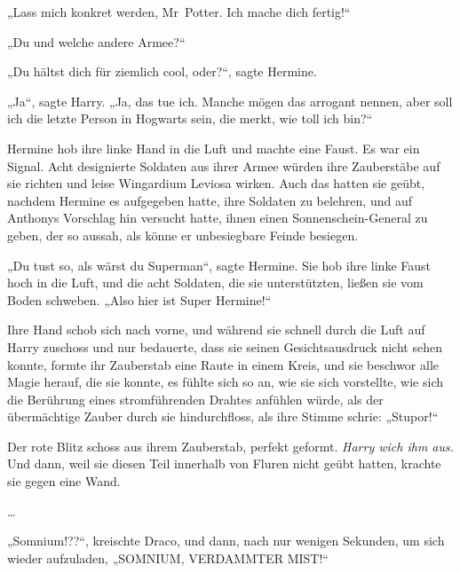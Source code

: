 {„Lass mich konkret werden, Mr~Potter. Ich mache dich fertig!“

„Du und welche andere Armee?“

„Du hältst dich für ziemlich cool, oder?“, sagte Hermine.

„Ja“, sagte Harry. „Ja, das tue ich. Manche mögen das arrogant nennen, aber soll ich die letzte Person in Hogwarts sein, die merkt, wie toll ich bin?“

Hermine hob ihre linke Hand in die Luft und machte eine Faust. Es war ein Signal. Acht designierte Soldaten aus ihrer Armee würden ihre Zauberstäbe auf sie richten und leise Wingardium Leviosa wirken. Auch das hatten sie geübt, nachdem Hermine es aufgegeben hatte, ihre Soldaten zu belehren, und auf Anthonys Vorschlag hin versucht hatte, ihnen einen Sonnenschein-General zu geben, der so aussah, als könne er unbesiegbare Feinde besiegen.

„Du tust so, als wärst du Superman“, sagte Hermine. Sie hob ihre linke Faust hoch in die Luft, und die acht Soldaten, die sie unterstützten, ließen sie vom Boden schweben. „Also hier ist Super Hermine!“

Ihre Hand schob sich nach vorne, und während sie schnell durch die Luft auf Harry zuschoss und nur bedauerte, dass sie seinen Gesichtsausdruck nicht sehen konnte, formte ihr Zauberstab eine Raute in einem Kreis, und sie beschwor alle Magie herauf, die sie konnte, es fühlte sich so an, wie sie sich vorstellte, wie sich die Berührung eines stromführenden Drahtes anfühlen würde, als der übermächtige Zauber durch sie hindurchfloss, als ihre Stimme schrie: „Stupor!“

Der rote Blitz schoss aus ihrem Zauberstab, perfekt geformt. \emph{Harry wich ihm aus.} Und dann, weil sie diesen Teil innerhalb von Fluren nicht geübt hatten, krachte sie gegen eine Wand.

…

„Somnium!??“, kreischte Draco, und dann, nach nur wenigen Sekunden, um sich wieder aufzuladen, „SOMNIUM, VERDAMMTER MIST!“

}
